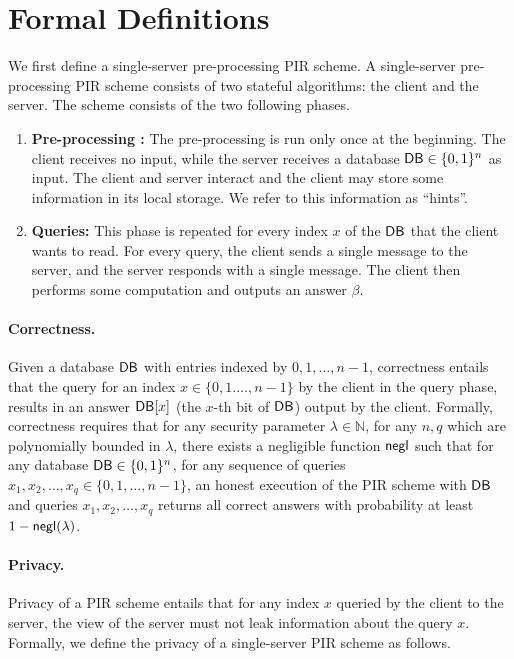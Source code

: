 \section{Formal Definitions}\label{sec:defs}
We first define a single-server pre-processing PIR scheme. 
A single-server pre-processing PIR scheme consists of two stateful algorithms: the client and the server. The scheme consists of the two following phases.
\begin{enumerate}
    \item {\bf Pre-processing :} The pre-processing is run only once at the beginning. The client receives no input, while the server receives a database $\mathsf{DB}\in \{0,1\}^n$ as input. The client and server interact and the client may store some information in its local storage. We refer to this information as ``hints''.
    \item {\bf Queries:} This phase is repeated for every index $x$ of the $\mathsf{DB}$ that the client wants to read. For every query, the client sends a single message to the server, and the server responds with a single message. The client then performs some computation and outputs an answer $\beta$.
\end{enumerate}

\paragraph{Correctness.} Given a database $\mathsf{DB}$ with entries indexed by $0,1,\ldots,n-1$, correctness entails that the query for an index $x\in \{0,1.\ldots,n-1\}$ by the client in the query phase, results in an answer $\mathsf{DB}[x]$ (the $x$-th bit of $\mathsf{DB}$) output by the client. 
Formally, correctness requires that for any 
security parameter $\lambda \in \mathbb{N}$, 
for any $n,q$ which are polynomially bounded in $\lambda$, 
there exists a negligible function $\mathsf{negl}$ such that for any database 
$\mathsf{DB}\in \{0,1\}^n$, for any sequence of queries $x_1,x_2,\ldots,x_q\in \{0,1,\ldots,n-1\}$, an honest execution of the PIR scheme with $\mathsf{DB}$ and queries $x_1,x_2,\ldots,x_q$ returns all correct answers with probability 
at least $1-\mathsf{negl}(\lambda)$.

\paragraph{Privacy.} Privacy of a PIR scheme entails that for any index $x$ queried by the client to the server, 
the view of the server must not leak information about the query $x$. 
Formally, we define the privacy of a single-server PIR scheme as follows.

